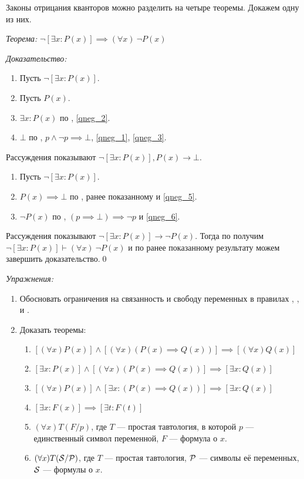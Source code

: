Законы отрицания кванторов можно разделить на четыре теоремы.
Докажем одну из них.

{\it Теорема:} $\lnot [\exists x:P(x)]\implies  (\forall x)~\lnot P(x)$

{\it Доказательство:}
\begin{enumerate}[label=(\arabic*)]
  \item{}\label{qneg_1}Пусть $\lnot[\exists x:P(x)]$.
  \item{}\label{qneg_2}Пусть $P(x)$.
  \item{}\label{qneg_3}$\exists x:P(x)$ по \Eii{}, \ref{qneg_2}.
  \item{}\label{qneg_4}$\bot$ по \taut{}, $p\land\lnot p\implies \bot$,
  \ref{qneg_1}, \ref{qneg_3}.
\end{enumerate}
Рассуждения показывают $\lnot[\exists x:P(x)], P(x)\to \bot$.
\begin{enumerate}[label=(\arabic*)]
  \item{}\label{qneg_5}Пусть $\lnot[\exists x:P(x)]$.
  \item{}\label{qneg_6}$P(x)\implies\bot$ по \implic{},
  ранее показанному и \ref{qneg_5}.
  \item{}\label{qneg_7}$\lnot P(x)$ по \taut{},
  $(p\implies\bot)\implies\lnot p$ и \ref{qneg_6}.
\end{enumerate}
Рассуждения показывают $\lnot[\exists x:P(x)]\to\lnot P(x)$.
Тогда по \Aii{} получим $\lnot[\exists x:P(x)]\vdash(\forall x)~\lnot P(x)$
и по ранее показанному результату
можем завершить доказательство.\qed

\vspace{1em}
{\it Упражнения:}
\begin{enumerate}
  \item{}Обосновать ограничения на связанность и свободу переменных в правилах
  \Aii{}, \Aee{}, \Eii{} и \Eee{}.
  \item{}Доказать теоремы:
  \begin{enumerate}
    \item{}$[(\forall x)P(x)]\land[(\forall x)(P(x)\implies Q(x))]
      \implies [(\forall x)Q(x)]$\label{thm:obv_forall}
    \item{}$[\exists x:P(x)]\land[(\forall x)(P(x)\implies Q(x))]
      \implies [\exists x:Q(x)]$
    \item{}$[(\forall x)P(x)]\land [\exists x:(P(x)\implies Q(x))]
      \implies [\exists x:Q(x)]$
    \item{}$[\exists x:F(x)]\implies [\exists t:F(t)]$
    \item{}$(\forall x)T(F/p)$, где $T$ --- простая тавтология,
    в которой $p$ --- единственный символ переменной, $F$ --- формула о $x$.
    \item{}$(\forall x)T(\mathcal S/\mathcal P)$, где $T$ --- простая тавтология,
    $\mathcal P$ --- символы её переменных, $\mathcal S$ --- формулы о $x$.\label{thm:obv_taut}
  \end{enumerate}
\end{enumerate}

